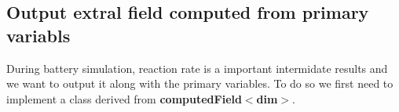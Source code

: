 \begin{DoxyCode}{0}
\end{DoxyCode}
\hypertarget{battery_electrode_scale_computed}{}\subsection{Output extral field computed from primary variabls}\label{battery_electrode_scale_computed}
During battery simulation, reaction rate is a important intermidate results and we want to output it along with the primary variables. To do so we first need to implement a class derived from {\bfseries{computed\+Field$<$dim$>$}}. 
